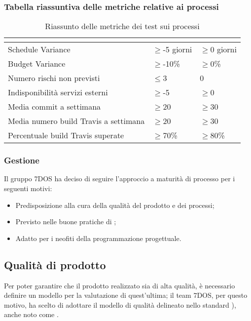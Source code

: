 \subsubsection{Tabella riassuntiva delle metriche relative ai processi}
\renewcommand{\arraystretch}{1.5}
\begin{table}[H]
	\centering
	\begin{tabular}{|C{5cm}|C{4cm}|C{4cm}|}
		\hline
		\textbf{\color{title_text}{Nome Metrica}} &  \textbf{\color{title_text}{Range accettabile}} & \textbf{\color{title_text}{Range ottimale}} \\ \hline
		Schedule Variance & $\geq$-5 giorni  & $\geq$0 giorni \\ \hline
		Budget Variance&$\geq$-10\% &$\geq$0\% \\ \hline
		Numero rischi non previsti&$\leq$3 & 0 \\ \hline
		Indisponibilità servizi esterni&$\geq$-5 &$\geq$0 \\ \hline
		Media commit a settimana&$\geq$20 &$\geq$30 \\ \hline
		Media numero build Travis a settimana&$\geq$20 &$\geq$30 \\ \hline
		Percentuale build Travis superate& $\geq$70\% &$\geq$80\% \\ \hline

	\end{tabular}
	\caption{Riassunto delle metriche dei test sui processi}
	\label{tabella:riassunto metriche dei test sui processi}
\end{table}
\renewcommand{\arraystretch}{1}

\subsubsection{Gestione}
	Il gruppo 7DOS ha deciso di seguire l'approccio a maturità di processo per i seguenti motivi:
	\begin{itemize}
	\item Predisposizione alla cura della qualità del prodotto e dei processi;
	\item Previsto nelle buone pratiche di ;
	\item Adatto per i neofiti della programmazione progettuale.
	\end{itemize}

\subsection{Qualità di prodotto}
Per poter garantire che il prodotto realizzato sia di alta qualità, è necessario definire un modello per la valutazione di quest'ultima; il team 7DOS, per questo motivo, ha scelto di adottare il modello di qualità delineato nello standard ), anche noto come .

